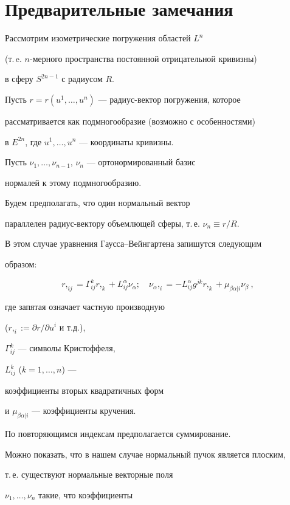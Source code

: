 \section{Предварительные замечания} \label{Prel}





Рассмотрим изометрические погружения областей $L^n$


(т.\,e. $n$-мерного пространства постоянной отрицательной кривизны)


в сферу $S^{2n-1}$ с радиусом $R$. 


Пусть $r=r(u^1,\dotsc,u^n)$ --- радиус-вектор погружения, которое 


рассматривается как подмногообразие (возможно с особенностями)


в $E^{2n}$, где $u^1,\dotsc,u^n$ --- координаты кривизны.


Пусть $\nu_1,\dotsc,\nu_{n-1}$, $\nu_n$ --- ортонормированный базис


нормалей к этому подмногообразию. 


Будем предполагать, что один нормальный вектор


параллелен радиус-вектору объемлющей сферы, т.\,е. $\nu_n\equiv r/R$.


В этом случае уравнения Гаусса--Вейнгартена запишутся следующим


образом:


$$


r,_{ij} = \Gamma_{ij}^k r,_{k} + L_{ij}^\alpha \nu_\alpha;\quad


\nu_\alpha,_{i} = - L_{ij}^\alpha g^{jk} r,_{k} + \mu_{\beta\alpha|i} \nu_\beta\ ,


$$


где запятая означает частную производную


($r,_i := \partial r/\partial u^i$ и т.д.),


$\Gamma_{ij}^k$ --- символы Кристоффеля,


$L_{ij}^k$ ($k=1,\dotsc,n$) ---


коэффициенты вторых квадратичных форм


и $\mu_{\beta\alpha|i}$ --- коэффициенты кручения.


По повторяющимся индексам предполагается суммирование.


Можно показать, что в нашем случае нормальный пучок является плоским,


т.\,е. существуют нормальные векторные поля


$\nu_1,\dotsc,\nu_n$ такие, что коэффициенты


